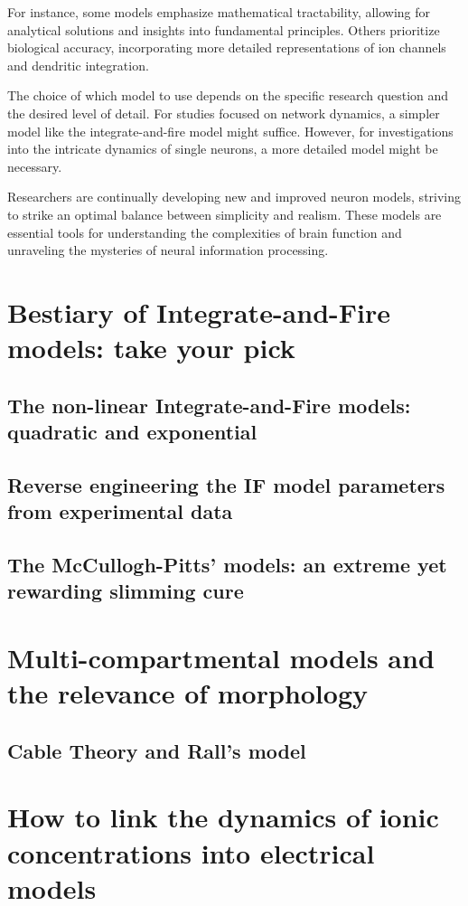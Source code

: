 For instance, some models emphasize mathematical tractability, allowing for analytical solutions and insights into fundamental principles. Others prioritize biological accuracy, incorporating more detailed representations of ion channels and dendritic integration.

The choice of which model to use depends on the specific research question and the desired level of detail. For studies focused on network dynamics, a simpler model like the integrate-and-fire model might suffice. However, for investigations into the intricate dynamics of single neurons, a more detailed model might be necessary.

Researchers are continually developing new and improved neuron models, striving to strike an optimal balance between simplicity and realism. These models are essential tools for understanding the complexities of brain function and unraveling the mysteries of neural information processing.


\section{Bestiary of Integrate-and-Fire models: take your pick}
\subsection{The non-linear Integrate-and-Fire models: quadratic and exponential}
\subsection{Reverse engineering the IF model parameters from experimental data}
\subsection{The McCullogh-Pitts’ models: an extreme yet rewarding slimming cure}


\section{Multi-compartmental models and the relevance of morphology}
\subsection{Cable Theory and Rall’s model}

\section{How to link the dynamics of ionic concentrations into electrical models}


